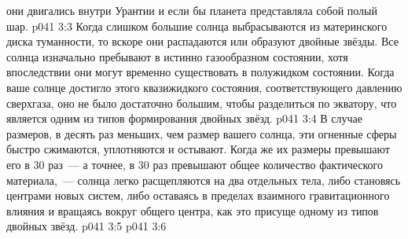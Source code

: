 они двигались внутри Урантии и если бы планета представляла собой полый шар.
\vs p041 3:3 \pc Когда слишком большие солнца выбрасываются из материнского диска туманности, то вскоре они распадаются или образуют двойные звёзды. Все солнца изначально пребывают в истинно газообразном состоянии, хотя впоследствии они могут временно существовать в полужидком состоянии. Когда ваше солнце достигло этого квазижидкого состояния, соответствующего давлению сверхгаза, оно не было достаточно большим, чтобы разделиться по экватору, что является одним из типов формирования двойных звёзд.
\vs p041 3:4 В случае размеров, в десять раз меньших, чем размер вашего солнца, эти огненные сферы быстро сжимаются, уплотняются и остывают. Когда же их размеры превышают его в 30 раз~--- а точнее, в 30 раз превышают общее количество фактического материала,~--- солнца легко расщепляются на два отдельных тела, либо становясь центрами новых систем, либо оставаясь в пределах взаимного гравитационного влияния и вращаясь вокруг общего центра, как это присуще одному из типов двойных звёзд.
\vs p041 3:5 \pc 
\vs p041 3:6 \pc 
